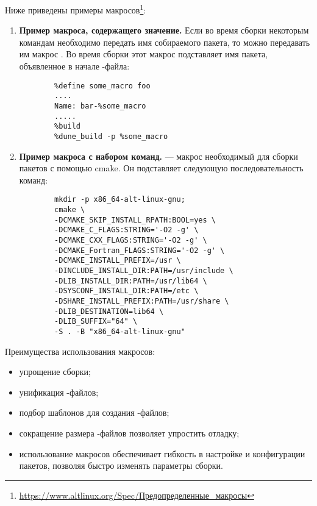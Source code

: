 Ниже приведены примеры макросов\footnote{\href{https://www.altlinux.org/Spec/\%D0\%9F\%D1\%80\%D0\%B5\%D0\%B4\%D0\%BE\%D0\%BF\%D1\%80\%D0\%B5\%D0\%B4\%D0\%B5\%D0\%BB\%D0\%B5\%D0\%BD\%D0\%BD\%D1\%8B\%D0\%B5_\%D0\%BC\%D0\%B0\%D0\%BA\%D1\%80\%D0\%BE\%D1\%81\%D1\%8B}{https://www.altlinux.org/Spec/Предопределенные\_макросы}}:
\begin{enumerate}
	\item \textbf{Пример макроса, содержащего значение.}
	Если во время сборки некоторым командам необходимо передать имя собираемого пакета, то можно передавать им макрос . Во время сборки этот макрос подставляет имя пакета, объявленное в начале -файла:
	\begin{verbatim}
		%define some_macro foo
		....
		Name: bar-%some_macro
		.....
		%build
		%dune_build -p %some_macro
	\end{verbatim} 
	
	\item \textbf{Пример макроса с набором команд.}
	 --- макрос необходимый для сборки пакетов с помощью cmake. Он подставляет следующую последовательность команд: 
	\begin{verbatim}
		mkdir -p x86_64-alt-linux-gnu; 
		cmake \
		-DCMAKE_SKIP_INSTALL_RPATH:BOOL=yes \
		-DCMAKE_C_FLAGS:STRING='-O2 -g' \
		-DCMAKE_CXX_FLAGS:STRING='-O2 -g' \
		-DCMAKE_Fortran_FLAGS:STRING='-O2 -g' \
		-DCMAKE_INSTALL_PREFIX=/usr \
		-DINCLUDE_INSTALL_DIR:PATH=/usr/include \
		-DLIB_INSTALL_DIR:PATH=/usr/lib64 \
		-DSYSCONF_INSTALL_DIR:PATH=/etc \
		-DSHARE_INSTALL_PREFIX:PATH=/usr/share \
		-DLIB_DESTINATION=lib64 \
		-DLIB_SUFFIX="64" \
		-S . -B "x86_64-alt-linux-gnu"
	\end{verbatim}
\end{enumerate}

Преимущества использования макросов:
\begin{itemize}
	\item упрощение сборки;
	\item унификация -файлов;
	\item подбор шаблонов для создания \Sys{SPEC}-файлов;
	\item сокращение размера \Sys{SPEC}-файлов позволяет упростить отладку;
	\item использование макросов обеспечивает гибкость в настройке и конфигурации пакетов, позволяя быстро изменять параметры сборки.
\end{itemize}

